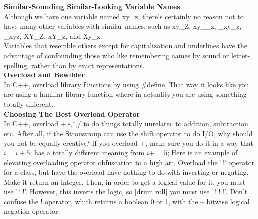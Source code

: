 \documentclass[11pt,twoside,a4paper]{article}
\begin{document}
\textbf{Similar-Sounding Similar-Looking Variable Names}~\\
Although we have one variable named xy\_z, there's certainly no reason not to have many other variables with similar names, such as xy\_Z, xy\_\_z, \_xy\_z, \_xyz, XY\_Z, xY\_z, and Xy\_z.~\\ 
Variables that resemble others except for capitalization and underlines have the advantage of confounding those who like remembering names by sound or letter-spelling, rather than by exact representations.~\\ 

\textbf{Overload and Bewilder}~\\
In C++, overload library functions by using \#define. That way it looks like you are using a familiar library function where in actuality you are using something totally different.~\\ 

\textbf{Choosing The Best Overload Operator}~\\
In C++, overload +,-,*,/ to do things totally unrelated to addition, subtraction etc. After all, if the Stroustroup can use the shift operator to do I/O, why should you not be equally creative? If you overload +, make sure you do it in a way that $i = i + 5$; has a totally different meaning from $i += 5$; Here is an example of elevating overloading operator obfuscation to a high art. Overload the '!' operator for a class, but have the overload have nothing to do with inverting or negating. Make it return an integer. Then, in order to get a logical value for it, you must use '! !'. However, this inverts the logic, so [drum roll] you must use '! ! !'. Don't confuse the ! operator, which returns a boolean 0 or 1, with the \~{} bitwise logical negation operator.~\\ 

\clearpage
\end{document}
